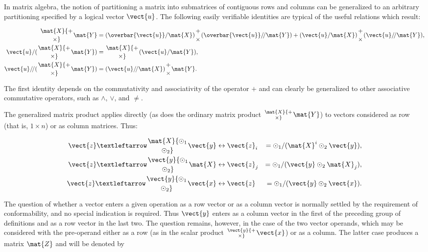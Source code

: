 \par In matrix algebra, the notion of partitioning a matrix into submatrices of contiguous rows and columns can be generalized to an arbitrary partitioning specified by a logical vector $\vect{u}$. The following easily verifiable identities are typical of the useful relations which result:

\begin{align*}
  \mat{X} {+ \atop \times} \mat{Y} &= (\overbar{\vect{u}}/\mat{X}) {+ \atop \times} (\overbar{\vect{u}}/\!/\mat{Y}) + (\vect{u}/\mat{X}) {+ \atop \times} (\vect{u}/\!/\mat{Y}), \\
  \vect{u}/(\mat{X} {+ \atop \times} \mat{Y}) &= \mat{X} {+ \atop \times} (\vect{u}/\mat{Y}), \\
  \vect{u}/\!/(\mat{X} {+ \atop \times} \mat{Y}) &= (\vect{u}/\!/\mat{X}) {+ \atop \times} \mat{Y}. \\
\end{align*}

\par The first identity depends on the commutativity and associativity of the operator $+$ and can clearly be generalized to other associative commutative operators, such as $\wedge$, $\vee$, and $\neq$.

\par The generalized matrix product applies directly (as does the ordinary matrix product $\mat{X} {+ \atop \times} \mat{Y}$) to vectors considered as row (that is, $1 \times n$) or as column matrices. Thus:

\begin{alignat*}{2}
  \vect{z} ← \mat{X}  {\odot_1 \atop \odot_2} \vect{y} & \leftrightarrow \vect{z}_{i} &= \odot_1/(\mat{X}^{i} \odot_2 \vect{y}), \\
  \vect{z} ← \vect{y} {\odot_1 \atop \odot_2} \mat{X}  & \leftrightarrow \vect{z}_{j} &= \odot_1/(\vect{y} \odot_2 \mat{X}_{j}), \\
  \vect{z} ← \vect{y} {\odot_1 \atop \odot_2} \vect{x} & \leftrightarrow \vect{z}     &= \odot_1/(\vect{y} \odot_2 \vect{x}).
\end{alignat*}

\par The question of whether a vector enters a given operation as a row vector or as a column vector is normally settled by the requirement of conformability, and no special indication is required. Thus $\vect{y}$ enters as a column vector in the first of the preceding group of definitions and as a row vector in the last two. The question remains, however, in the case of the two vector operands, which may be considered with the pre-operand either as a row (as in the scalar product $\vect{y} {+ \atop \times} \vect{x}$) or as a column. The latter case produces a matrix $\mat{Z}$ and will be denoted by

